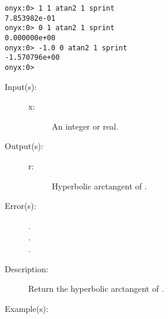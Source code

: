 \begin{description}
\begin{description}
\begin{verbatim}
onyx:0> 1 1 atan2 1 sprint
7.853982e-01
onyx:0> 0 1 atan2 1 sprint
0.000000e+00
onyx:0> -1.0 0 atan2 1 sprint
-1.570796e+00
onyx:0>
		\end{verbatim}
	\end{description}
\label{systemdict:atanh}
\item[{\onyxop{x}{atanh}{r}}: ]
	\begin{description}\item[]
	\item[Input(s): ]
		\begin{description}\item[]
		\item[x: ]
			An integer or real.
		\end{description}
	\item[Output(s): ]
		\begin{description}\item[]
		\item[r: ]
			Hyperbolic arctangent of .
		\end{description}
	\item[Error(s): ]
		\begin{description}\item[]
		\item[.]
		\item[.]
		\item[.]
		\end{description}
	\item[Description: ]
		Return the hyperbolic arctangent of .
	\item[Example(s): ]\begin{verbatim}


\end{verbatim}
\end{description}
\end{description}
